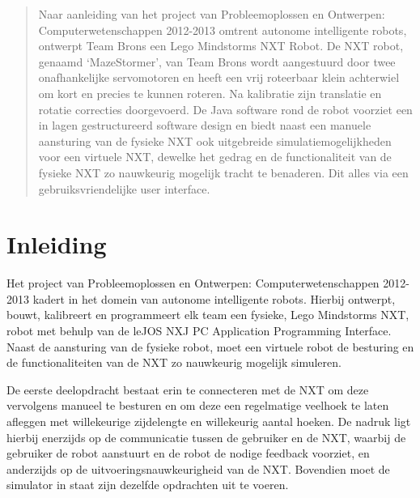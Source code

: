 \documentclass[tt1]{penoverslag}
\begin{document}

\maketitlepage

\begin{abstract}
Naar aanleiding van het project van Probleemoplossen en Ontwerpen: Computerwetenschappen 2012-2013 omtrent autonome intelligente robots, ontwerpt Team Brons een Lego Mindstorms NXT Robot. De NXT robot, genaamd ‘MazeStormer’, van Team Brons wordt aangestuurd door twee onafhankelijke servomotoren en heeft een vrij roteerbaar klein achterwiel om kort en precies te kunnen roteren. Na kalibratie zijn translatie en rotatie correcties doorgevoerd. De Java software rond de robot voorziet een in lagen gestructureerd software design en biedt naast een manuele aansturing van de fysieke NXT ook uitgebreide simulatiemogelijkheden voor een virtuele NXT, dewelke het gedrag en de functionaliteit van de fysieke NXT zo nauwkeurig mogelijk tracht te benaderen. Dit alles via een gebruiksvriendelijke user interface.
\end{abstract}

\tableofcontents

\newpage

\section*{Inleiding}
Het project van Probleemoplossen en Ontwerpen: Computerwetenschappen 2012-2013 kadert in het domein van autonome intelligente robots. Hierbij ontwerpt, bouwt, kalibreert  en programmeert elk team een fysieke, Lego Mindstorms NXT, robot met behulp van de leJOS NXJ PC Application Programming Interface. Naast de aansturing van de fysieke robot, moet een virtuele robot de besturing en de functionaliteiten van de NXT zo nauwkeurig mogelijk simuleren.

De eerste deelopdracht bestaat erin te connecteren met de NXT om deze vervolgens manueel te besturen en om deze een regelmatige veelhoek te laten afleggen met willekeurige zijdelengte en willekeurig aantal hoeken. De nadruk ligt hierbij enerzijds op de communicatie tussen de gebruiker en de NXT, waarbij de gebruiker de robot aanstuurt en de robot de nodige feedback voorziet, en anderzijds op de uitvoeringsnauwkeurigheid van de NXT. Bovendien moet de simulator in staat zijn dezelfde opdrachten uit te voeren.
\end{document}
